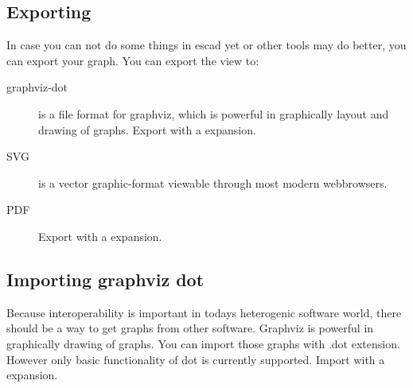 \documentclass[a4paper, 12pt, openany]{scrbook}
\begin{document}
\subsection{Exporting}
In case you can not do some things in escad yet or other tools may do better, you can export your graph. You can export the view to:
\begin{description}
\item[graphviz-dot] is a file format for graphviz, which is powerful in graphically layout and drawing of graphs. Export with a expansion.
\item[SVG] is a vector graphic-format viewable through most modern webbrowsers.
\item[PDF] Export with a expansion.
\end{description}
\subsection{Importing graphviz dot}
Because interoperability is important in todays heterogenic software world, there should be a way to get graphs from other software.
Graphviz is powerful in graphically drawing of graphs. You can import those graphs with .dot extension. However only basic functionality of dot is currently supported. Import with a expansion.
\end{document}
